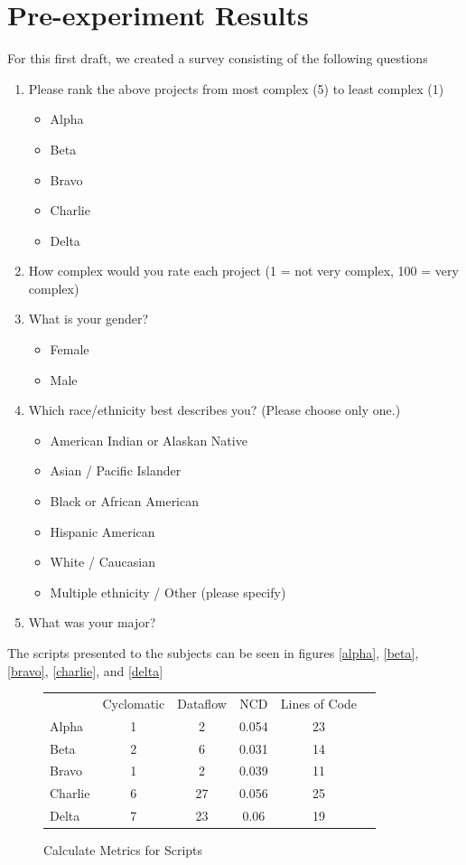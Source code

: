 \documentclass[]{article}
\begin{document}
\section{Pre-experiment Results}

For this first draft, we created a survey consisting of the following questions
\begin{enumerate}
	\item Please rank the above projects from most complex (5) to least complex (1)
	\begin{itemize}
		\item Alpha
		\item Beta
		\item Bravo
		\item Charlie
		\item Delta
	\end{itemize}
	\item How complex would you rate each project (1 = not very complex, 100 = very complex)
	\item What is your gender?
	\begin{itemize}
		\item Female
		\item Male
	\end{itemize}
	\item Which race/ethnicity best describes you? (Please choose only one.)
	\begin{itemize}
		\item American Indian or Alaskan Native
		\item Asian / Pacific Islander
		\item Black or African American
		\item Hispanic American
		\item White / Caucasian
		\item Multiple ethnicity / Other (please specify)
	\end{itemize}
	\item What was your major?
\end{enumerate}

The scripts presented to the subjects can be seen in figures \ref{alpha}, \ref{beta}, \ref{bravo}, \ref{charlie}, and \ref{delta}

\begin{figure}[fh!]
	\caption{Calculate Metrics for Scripts}
	\label{calculate_metrics}
	\centering
	\begin{tabular}{l || c | c | c | c| c }
		& Cyclomatic & Dataflow & NCD & Lines of Code \\
		Alpha & 1 & 2 & 0.054 & 23 \\
		Beta & 2 & 6 & 0.031 & 14 \\
		Bravo & 1 & 2 & 0.039 & 11 \\
		Charlie & 6 & 27 & 0.056 & 25 \\
		Delta & 7 & 23 & 0.06 & 19
	\end{tabular}
\end{figure}
\end{document}
